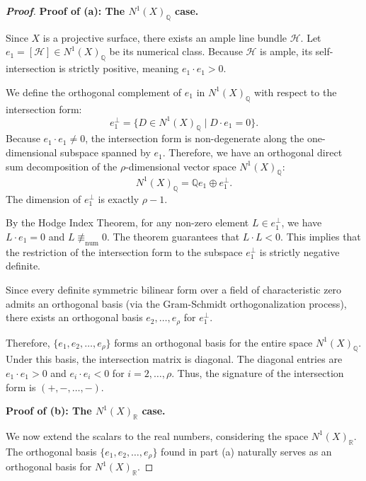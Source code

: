 \begin{proof}[\textbf{Proof}]
\textbf{Proof of (a): The $N^1(X)_\mathbb{Q}$ case.}

Since $X$ is a projective surface, there exists an ample line bundle $\mathcal{H}$. Let $e_1 = [\mathcal{H}] \in N^1(X)_\mathbb{Q}$ be its numerical class. Because $\mathcal{H}$ is ample, its self-intersection is strictly positive, meaning $e_1 \cdot e_1 > 0$.

We define the orthogonal complement of $e_1$ in $N^1(X)_\mathbb{Q}$ with respect to the intersection form:
\[
e_1^\perp = \{ D \in N^1(X)_\mathbb{Q} \mid D \cdot e_1 = 0 \}.
\]
Because $e_1 \cdot e_1 \neq 0$, the intersection form is non-degenerate along the one-dimensional subspace spanned by $e_1$. Therefore, we have an orthogonal direct sum decomposition of the $\rho$-dimensional vector space $N^1(X)_\mathbb{Q}$:
\[
N^1(X)_\mathbb{Q} = \mathbb{Q}e_1 \oplus e_1^\perp.
\]
The dimension of $e_1^\perp$ is exactly $\rho - 1$. 

By the Hodge Index Theorem, for any non-zero element $L \in e_1^\perp$, we have $L \cdot e_1 = 0$ and $L \not\equiv_{\text{num}} 0$. The theorem guarantees that $L \cdot L < 0$. This implies that the restriction of the intersection form to the subspace $e_1^\perp$ is strictly negative definite.

Since every definite symmetric bilinear form over a field of characteristic zero admits an orthogonal basis (via the Gram-Schmidt orthogonalization process), there exists an orthogonal basis $e_2, \dots, e_\rho$ for $e_1^\perp$. 

Therefore, $\{e_1, e_2, \dots, e_\rho\}$ forms an orthogonal basis for the entire space $N^1(X)_\mathbb{Q}$. Under this basis, the intersection matrix is diagonal. The diagonal entries are $e_1 \cdot e_1 > 0$ and $e_i \cdot e_i < 0$ for $i = 2, \dots, \rho$. Thus, the signature of the intersection form is $(+, -, \dots, -)$.

\textbf{Proof of (b): The $N^1(X)_\mathbb{R}$ case.}

We now extend the scalars to the real numbers, considering the space $N^1(X)_\mathbb{R}$. The orthogonal basis $\{e_1, e_2, \dots, e_\rho\}$ found in part (a) naturally serves as an orthogonal basis for $N^1(X)_\mathbb{R}$.


\end{proof}
